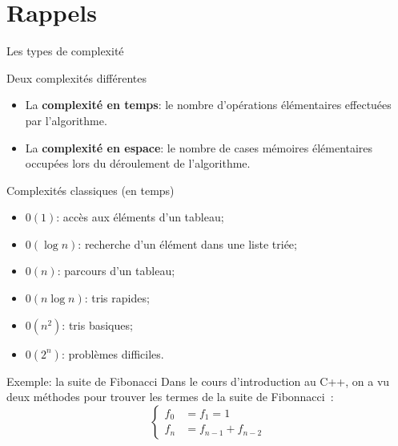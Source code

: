 
\date[7 fév. 2022]{Lundi 7 février 2022}
\subtitle{Algorithmes de tri}
\maketitle

\section{Rappels}

\begin{frame}{Les types de complexité}
\begin{block}{Deux complexités différentes}
  \begin{itemize}
    \item La \textbf{complexité en temps}: le nombre d'opérations élémentaires effectuées par l'algorithme.
    \item La \textbf{complexité en espace}: le nombre de cases mémoires élémentaires occupées lors du déroulement de l'algorithme.
  \end{itemize}
\end{block}
\end{frame}

\begin{frame}{Complexités classiques (en temps)}
\begin{itemize}
\item $0(1)$: accès aux éléments d'un tableau;
\item $0(\log n)$: recherche d'un élément dans une liste triée;
\item $0(n)$: parcours d'un tableau;
\item $0(n \log n)$: tris rapides;
\item $0(n^2)$: tris basiques;
\item $0(2^n)$: problèmes difficiles.
\end{itemize}

\end{frame}

\begin{frame}{Exemple: la suite de Fibonacci}
	Dans le cours d'introduction au C++, on a vu deux méthodes pour trouver les termes de la suite de Fibonnacci~:
	\begin{equation*}
	\left\{
	\begin{array}{rl}
	f_0 &= f_1 = 1 \\
	f_n&= f_{n-1} + f_{n-2}
	\end{array}
	\right.
	\end{equation*}
\end{frame}

